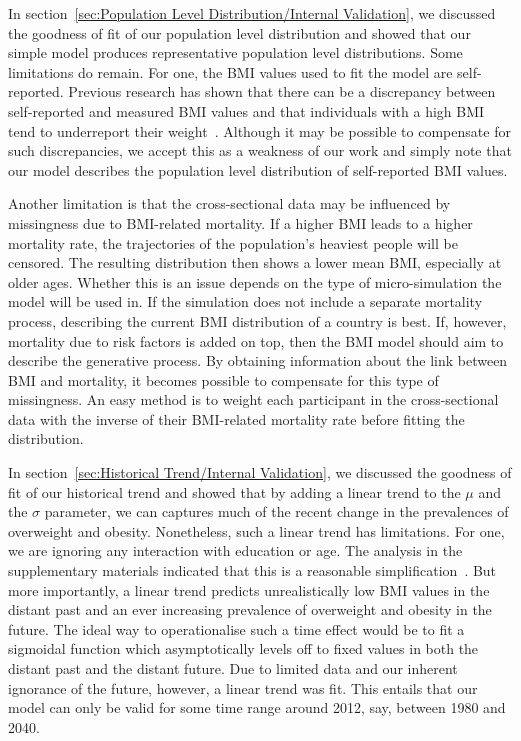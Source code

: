 \documentclass{imammb}
\numberwithin{equation}{section}
\begin{document}
In section~\ref{sec:Population Level Distribution/Internal Validation}, we discussed the goodness of fit of our population level distribution and showed that our simple model produces representative population level distributions. Some limitations do remain. For one, the BMI values used to fit the model are self-reported. Previous research has shown that there can be a discrepancy between self-reported and measured BMI values and that individuals with a high BMI tend to underreport their weight~\citep{Olfert2018}. Although it may be possible to compensate for such discrepancies, we accept this as a weakness of our work and simply note that our model describes the population level distribution of self-reported BMI values.

Another limitation is that the cross-sectional data may be influenced by missingness due to BMI-related mortality. If a higher BMI leads to a higher mortality rate, the trajectories of the population's heaviest people will be censored. The resulting distribution then shows a lower mean BMI, especially at older ages. Whether this is an issue depends on the type of micro-simulation the model will be used in. If the simulation does not include a separate mortality process, describing the current BMI distribution of a country is best. If, however, mortality due to risk factors is added on top, then the BMI model should aim to describe the generative process. By obtaining information about the link between BMI and mortality, it becomes possible to compensate for this type of missingness. An easy method is to weight each participant in the cross-sectional data with the inverse of their BMI-related mortality rate before fitting the distribution.

In section~\ref{sec:Historical Trend/Internal Validation}, we discussed the goodness of fit of our historical trend and showed that by adding a linear trend to the $\mu$ and the $\sigma$ parameter, we can captures much of the recent change in the prevalences of overweight and obesity. Nonetheless, such a linear trend has limitations. For one, we are ignoring any interaction with education or age. The analysis in the supplementary materials indicated that this is a reasonable simplification~\citep{Bogaardt2023}. But more importantly, a linear trend predicts unrealistically low BMI values in the distant past and an ever increasing prevalence of overweight and obesity in the future. The ideal way to operationalise such a time effect would be to fit a sigmoidal function which asymptotically levels off to fixed values in both the distant past and the distant future. Due to limited data and our inherent ignorance of the future, however, a linear trend was fit. This entails that our model can only be valid for some time range around 2012, say, between 1980 and 2040.
\end{document}
